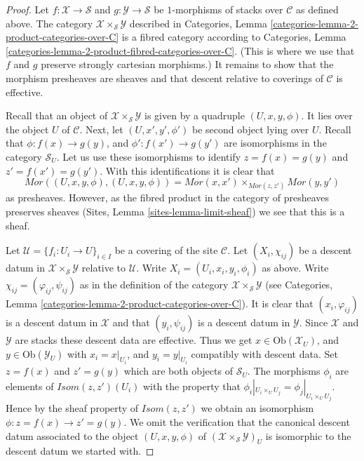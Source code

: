 \begin{proof}
Let $f : \mathcal{X} \to \mathcal{S}$ and
$g : \mathcal{Y} \to \mathcal{S}$ be
$1$-morphisms of stacks over $\mathcal{C}$
as defined above. The category
$\mathcal{X} \times_{\mathcal{S}} \mathcal{Y}$
described in
Categories, Lemma \ref{categories-lemma-2-product-categories-over-C} is a
fibred category according to
Categories, Lemma \ref{categories-lemma-2-product-fibred-categories-over-C}.
(This is where we use that $f$ and $g$ preserve strongly cartesian
morphisms.) It remains to show that the morphism presheaves are sheaves
and that descent relative to coverings of $\mathcal{C}$ is effective.

\medskip\noindent
Recall that an object of $\mathcal{X} \times_{\mathcal{S}} \mathcal{Y}$
is given by a quadruple $(U, x, y, \phi)$.
It lies over the object
$U$ of $\mathcal{C}$. Next, let $(U, x', y', \phi')$ be second
object lying over $U$.
Recall that $\phi : f(x) \to g(y)$, and $\phi' : f(x') \to g(y')$
are isomorphisms in the category $\mathcal{S}_U$. Let us
use these isomorphisms to identify $z = f(x) = g(y)$ and
$z' = f(x') = g(y')$. With this identifications
it is clear that
$$
\mathit{Mor}((U, x, y, \phi), (U, x, y, \phi))
=
\mathit{Mor}(x, x')
\times_{\mathit{Mor}(z, z')}
\mathit{Mor}(y, y')
$$
as presheaves. However, as the fibred product in the category of
presheaves preserves sheaves (Sites, Lemma \ref{sites-lemma-limit-sheaf})
we see that this is a sheaf.

\medskip\noindent
Let $\mathcal{U} = \{f_i : U_i \to U\}_{i \in I}$ be a covering of the site
$\mathcal{C}$. Let $(X_i, \chi_{ij})$ be a descent datum
in $\mathcal{X} \times_{\mathcal{S}} \mathcal{Y}$ relative to $\mathcal{U}$.
Write $X_i = (U_i, x_i, y_i, \phi_i)$ as above. Write
$\chi_{ij} = (\varphi_{ij}, \psi_{ij})$ as in the definition of
the category $\mathcal{X} \times_{\mathcal{S}} \mathcal{Y}$ (see
Categories, Lemma \ref{categories-lemma-2-product-categories-over-C}).
It is clear that $(x_i, \varphi_{ij})$ is a descent datum in
$\mathcal{X}$ and that $(y_i, \psi_{ij})$ is a descent datum in 
$\mathcal{Y}$. Since $\mathcal{X}$ and $\mathcal{Y}$ are stacks these
descent data are effective. Thus we get
$x \in \text{Ob}(\mathcal{X}_U)$, and $y \in \text{Ob}(\mathcal{Y}_U)$
with $x_i = x|_{U_i}$, and $y_i = y|_{U_i}$ compatibly with descent data.
Set $z = f(x)$ and $z' = g(y)$ which are both objects of $\mathcal{S}_U$.
The morphisms $\phi_i$ are elements of
$\mathit{Isom}(z, z')(U_i)$ with the property that
$\phi_i|_{U_i \times_U U_j} = \phi_j|_{U_i \times_U U_j}$.
Hence by the sheaf property of $\mathit{Isom}(z, z')$
we obtain an isomorphism $\phi : z = f(x) \to z' = g(y)$.
We omit the verification that the canonical descent datum associated to
the object $(U, x, y, \phi)$ of
$(\mathcal{X} \times_{\mathcal{S}} \mathcal{Y})_U$ is isomorphic
to the descent datum we started with.
\end{proof}


